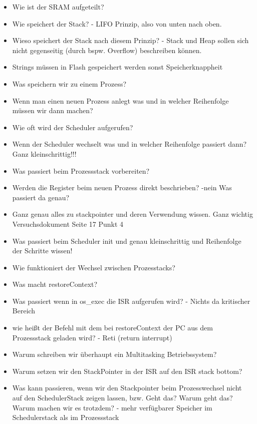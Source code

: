 \documentclass[12pt]{article}
\begin{document}
\begin{itemize}
\item Wie ist der SRAM aufgeteilt?
\item Wie speichert der Stack? - LIFO Prinzip, also von unten nach oben.
\item Wieso speichert der Stack nach diesem Prinzip? - Stack und Heap sollen sich nicht gegenseitig (durch bspw. Overflow) beschreiben können.
\item Strings müssen in Flash gespeichert werden sonst Speicherknappheit
\item Was speichern wir zu einem Prozess?
\item Wenn man einen neuen Prozess anlegt was und in welcher Reihenfolge müssen wir dann machen?
\item Wie oft wird der Scheduler aufgerufen?
\item Wenn der Scheduler wechselt was und in welcher Reihenfolge passiert dann? Ganz kleinschrittig!!!
\item Was passiert beim Prozessstack vorbereiten?
\item Werden die Register beim neuen Prozess direkt beschrieben? -nein Was passiert da genau?
\item Ganz genau alles zu stackpointer und deren Verwendung wissen. Ganz wichtig Versuchsdokument Seite 17 Punkt 4
\item Was passiert beim Scheduler init und genau kleinschrittig und Reihenfolge der Schritte wissen!
\item Wie funktioniert der Wechsel zwischen Prozesstacks?
\item Was macht restoreContext?
\item Was passiert wenn in os\_exec die ISR aufgerufen wird? - Nichts da kritischer Bereich
\item wie heißt der Befehl mit dem bei restoreContext der PC aus dem Prozessstack geladen wird? - Reti (return interrupt)
\item Warum schreiben wir überhaupt ein Multitasking Betriebssystem?
\item Warum setzen wir den StackPointer in der ISR auf den ISR stack bottom?
\item Was kann passieren, wenn wir den Stackpointer beim Prozesswechsel nicht auf den SchedulerStack zeigen lassen, bzw. Geht das? Warum geht das? Warum machen wir es trotzdem? - mehr verfügbarer Speicher im Schedulerstack als im Prozessstack
\end{itemize}
\end{document}
